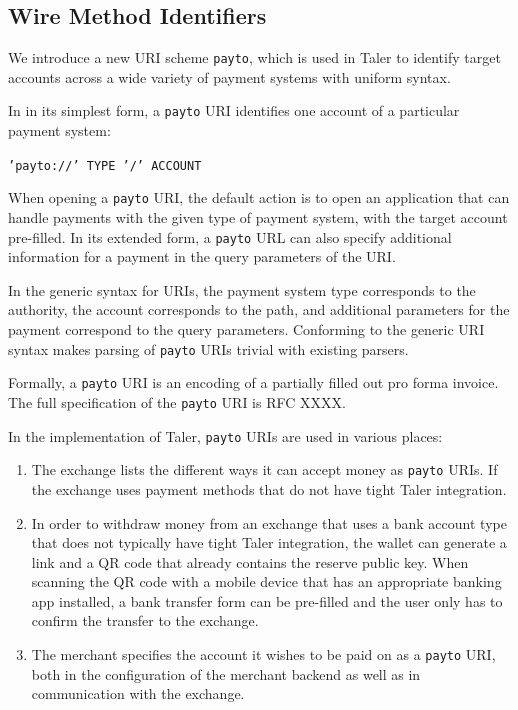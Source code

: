 \subsection{Wire Method Identifiers}\label{implementation:wire-method-identifiers}
We introduce a new URI scheme \texttt{payto}, which is used in Taler to
identify target accounts across a wide variety of payment systems with uniform
syntax.

In in its simplest form, a \texttt{payto} URI identifies one account of a particular payment system:

\begin{center}
  \texttt{'payto://' TYPE '/' ACCOUNT }
\end{center}

When opening a \texttt{payto} URI, the default action is to open an application
that can handle payments with the given type of payment system, with the target
account pre-filled.  In its extended form, a \texttt{payto} URL can also specify
additional information for a payment in the query parameters of the URI.

In the generic syntax for URIs, the payment system type corresponds to the
authority, the account corresponds to the path, and additional parameters for
the payment correspond to the query parameters.  Conforming to the generic URI
syntax makes parsing of \texttt{payto} URIs trivial with existing parsers.

Formally, a \texttt{payto} URI is an encoding of a partially filled out pro
forma invoice.  The full specification of the \texttt{payto} URI is RFC XXXX. %

In the implementation of Taler, \texttt{payto} URIs are used in various places:
\begin{enumerate}
  \item The exchange lists the different ways it can accept money as \texttt{payto} URIs.
    If the exchange uses payment methods that do not have tight Taler integration.
  \item In order to withdraw money from an exchange that uses a bank account type that
    does not typically have tight Taler integration, the wallet can generate a link and a QR code
    that already contains the reserve public key.  When scanning the QR code with a mobile device that
    has an appropriate banking app installed, a bank transfer form can be pre-filled and the user only has to confirm the
    transfer to the exchange.
  \item The merchant specifies the account it wishes to be paid on as a \texttt{payto} URI, both in
    the configuration of the merchant backend as well as in communication with the exchange.
\end{enumerate}

